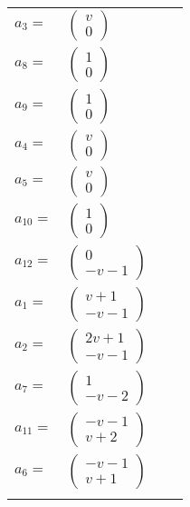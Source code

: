 \documentclass[1p]{elsarticle_modified}
\theoremstyle{definition}
\begin{document}
\begin{tabular}{m{7pt} m{180pt} m{7pt} m{180pt} }
\flushright $a_{3}=$&$\begin{pmatrix}v\\0\end{pmatrix}$ \\
\flushright $a_{8}=$&$\begin{pmatrix}1\\0\end{pmatrix}$ \\
\flushright $a_{9}=$&$\begin{pmatrix}1\\0\end{pmatrix}$ \\
\flushright $a_{4}=$&$\begin{pmatrix}v\\0\end{pmatrix}$ \\
\flushright $a_{5}=$&$\begin{pmatrix}v\\0\end{pmatrix}$ \\
\flushright $a_{10}=$&$\begin{pmatrix}1\\0\end{pmatrix}$ \\
\flushright $a_{12}=$&$\begin{pmatrix}0\\- v-1\end{pmatrix}$ \\
\flushright $a_{1}=$&$\begin{pmatrix}v+1\\- v-1\end{pmatrix}$ \\
\flushright $a_{2}=$&$\begin{pmatrix}2 v+1\\- v-1\end{pmatrix}$ \\
\flushright $a_{7}=$&$\begin{pmatrix}1\\- v-2\end{pmatrix}$ \\
\flushright $a_{11}=$&$\begin{pmatrix}- v-1\\v+2\end{pmatrix}$ \\
\flushright $a_{6}=$&$\begin{pmatrix}- v-1\\v+1\end{pmatrix}$\\&\end{tabular}
\end{document}
